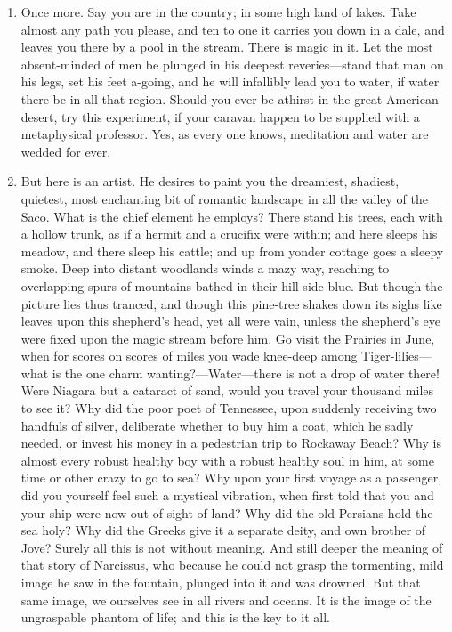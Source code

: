 \documentclass{armymemo}
\begin{document}
\begin{enumerate}
\begin{enumerate}
  \item Once more. Say you are in the country; in some high land of lakes. Take
    almost any path you please, and ten to one it carries you down in a dale,
    and leaves you there by a pool in the stream. There is magic in it. Let the
    most absent-minded of men be plunged in his deepest reveries—stand that man
    on his legs, set his feet a-going, and he will infallibly lead you to water,
    if water there be in all that region.  Should you ever be athirst in the
    great American desert, try this experiment, if your caravan happen to be
    supplied with a metaphysical professor. Yes, as every one knows, meditation
    and water are wedded for ever.

  \item But here is an artist. He desires to paint you the dreamiest, shadiest,
    quietest, most enchanting bit of romantic landscape in all the valley of the
    Saco. What is the chief element he employs? There stand his trees, each with
    a hollow trunk, as if a hermit and a crucifix were within; and here sleeps
    his meadow, and there sleep his cattle; and up from yonder cottage goes a
    sleepy smoke. Deep into distant woodlands winds a mazy way, reaching to
    overlapping spurs of mountains bathed in their hill-side blue. But though
    the picture lies thus tranced, and though this pine-tree shakes down its
    sighs like leaves upon this shepherd’s head, yet all were vain, unless the
    shepherd’s eye were fixed upon the magic stream before him. Go visit the
    Prairies in June, when for scores on scores of miles you wade knee-deep
    among Tiger-lilies—what is the one charm wanting?—Water—there is not a drop
    of water there! Were Niagara but a cataract of sand, would you travel your
    thousand miles to see it? Why did the poor poet of Tennessee, upon suddenly
    receiving two handfuls of silver, deliberate whether to buy him a coat,
    which he sadly needed, or invest his money in a pedestrian trip to Rockaway
    Beach? Why is almost every robust healthy boy with a robust healthy soul in
    him, at some time or other crazy to go to sea?  Why upon your first voyage
    as a passenger, did you yourself feel such a mystical vibration, when first
    told that you and your ship were now out of sight of land? Why did the old
    Persians hold the sea holy? Why did the Greeks give it a separate deity, and
    own brother of Jove? Surely all this is not without meaning. And still
    deeper the meaning of that story of Narcissus, who because he could not
    grasp the tormenting, mild image he saw in the fountain, plunged into it and
    was drowned. But that same image, we ourselves see in all rivers and
    oceans. It is the image of the ungraspable phantom of life; and this is the
    key to it all.
    

\end{enumerate}
\end{enumerate}
\end{document}
